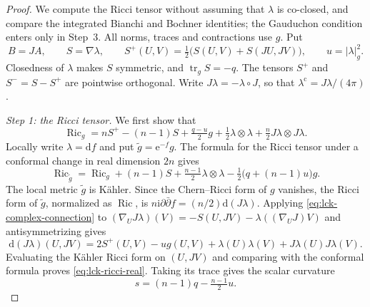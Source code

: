 \begin{proof}
We compute the Ricci tensor without assuming that $\lambda$ is co-closed, and compare the integrated Bianchi and Bochner identities; the Gauduchon condition enters only in Step~3. All norms, traces and contractions use $g$. Put
\[
 B=JA,\qquad S=\nabla\lambda,\qquad
 S^+(U,V)=\tfrac12\bigl(S(U,V)+S(JU,JV)\bigr),\qquad
 u=|\lambda|_g^2.
\]
Closedness of $\lambda$ makes $S$ symmetric, and $\operatorname{tr}_gS=-q$. The tensors $S^+$ and $S^-=S-S^+$ are pointwise orthogonal. Write $J\lambda=-\lambda\circ J$, so that $\lambda^{\mathrm c}=J\lambda/(4\pi)$.

\emph{Step 1: the Ricci tensor.} We first show that
\begin{equation}\label{eq:lck-ricci-real}
 \operatorname{Ric}_g
 =nS^+-(n-1)S+\tfrac{q-u}{2}g
       +\tfrac12\lambda\otimes\lambda
       +\tfrac n2 J\lambda\otimes J\lambda.
\end{equation}
Locally write $\lambda=\mathrm df$ and put $\widetilde g=\mathrm e^{-f}g$. The formula for the Ricci tensor under a conformal change in real dimension $2n$ gives
\[
 \operatorname{Ric}_{\widetilde g}
 =\operatorname{Ric}_g+(n-1)S
       +\tfrac{n-1}{2}\lambda\otimes\lambda
       -\tfrac12\bigl(q+(n-1)u\bigr)g.
\]
The local metric $\widetilde g$ is K\"ahler. Since the Chern--Ricci form of $g$ vanishes, the Ricci form of $\widetilde g$, normalized as $\operatorname{Ric}$, is $n\mathrm i\partial\bar\partial f=(n/2)\mathrm d(J\lambda)$.
Applying \eqref{eq:lck-complex-connection} to
$(\nabla_UJ\lambda)(V)=-S(U,JV)-\lambda((\nabla_UJ)V)$ and antisymmetrizing gives
\[
 \mathrm d(J\lambda)(U,JV)
 =2S^+(U,V)-u g(U,V)
             +\lambda(U)\lambda(V)+J\lambda(U)J\lambda(V).
\]
Evaluating the K\"ahler Ricci form on $(U,JV)$ and comparing with the conformal formula proves \eqref{eq:lck-ricci-real}. Taking its trace gives the scalar curvature
\[
 s=(n-1)q-\tfrac{n-1}{2}u.
\]


\end{proof}
